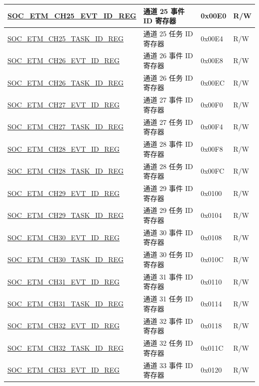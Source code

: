 \begin{longtable}{ | p{6cm} | p{6.2cm} | p{1.3cm} | p{2cm} | }
\hyperref[regdesc:SOCETMCHNEVTIDREG]{SOC\_ETM\_CH25\_EVT\_ID\_REG} & 通道 25 事件 ID 寄存器 & 0x00E0 & R/W \\ \hline
\hyperref[regdesc:SOCETMCHNTASKIDREG]{SOC\_ETM\_CH25\_TASK\_ID\_REG} & 通道 25 任务 ID 寄存器 & 0x00E4 & R/W \\ \hline
\hyperref[regdesc:SOCETMCHNEVTIDREG]{SOC\_ETM\_CH26\_EVT\_ID\_REG} & 通道 26 事件 ID 寄存器 & 0x00E8 & R/W \\ \hline
\hyperref[regdesc:SOCETMCHNTASKIDREG]{SOC\_ETM\_CH26\_TASK\_ID\_REG} & 通道 26 任务 ID 寄存器 & 0x00EC & R/W \\ \hline
\hyperref[regdesc:SOCETMCHNEVTIDREG]{SOC\_ETM\_CH27\_EVT\_ID\_REG} & 通道 27 事件 ID 寄存器 & 0x00F0 & R/W \\ \hline
\hyperref[regdesc:SOCETMCHNTASKIDREG]{SOC\_ETM\_CH27\_TASK\_ID\_REG} & 通道 27 任务 ID 寄存器 & 0x00F4 & R/W \\ \hline
\hyperref[regdesc:SOCETMCHNEVTIDREG]{SOC\_ETM\_CH28\_EVT\_ID\_REG} & 通道 28 事件 ID 寄存器 & 0x00F8 & R/W \\ \hline
\hyperref[regdesc:SOCETMCHNTASKIDREG]{SOC\_ETM\_CH28\_TASK\_ID\_REG} & 通道 28 任务 ID 寄存器 & 0x00FC & R/W \\ \hline
\hyperref[regdesc:SOCETMCHNEVTIDREG]{SOC\_ETM\_CH29\_EVT\_ID\_REG} & 通道 29 事件 ID 寄存器 & 0x0100 & R/W \\ \hline
\hyperref[regdesc:SOCETMCHNTASKIDREG]{SOC\_ETM\_CH29\_TASK\_ID\_REG} & 通道 29 任务 ID 寄存器 & 0x0104 & R/W \\ \hline
\hyperref[regdesc:SOCETMCHNEVTIDREG]{SOC\_ETM\_CH30\_EVT\_ID\_REG} & 通道 30 事件 ID 寄存器 & 0x0108 & R/W \\ \hline
\hyperref[regdesc:SOCETMCHNTASKIDREG]{SOC\_ETM\_CH30\_TASK\_ID\_REG} & 通道 30 任务 ID 寄存器 & 0x010C & R/W \\ \hline
\hyperref[regdesc:SOCETMCHNEVTIDREG]{SOC\_ETM\_CH31\_EVT\_ID\_REG} & 通道 31 事件 ID 寄存器 & 0x0110 & R/W \\ \hline
\hyperref[regdesc:SOCETMCHNTASKIDREG]{SOC\_ETM\_CH31\_TASK\_ID\_REG} & 通道 31 任务 ID 寄存器 & 0x0114 & R/W \\ \hline
\hyperref[regdesc:SOCETMCHNEVTIDREG]{SOC\_ETM\_CH32\_EVT\_ID\_REG} & 通道 32 事件 ID 寄存器 & 0x0118 & R/W \\ \hline
\hyperref[regdesc:SOCETMCHNTASKIDREG]{SOC\_ETM\_CH32\_TASK\_ID\_REG} & 通道 32 任务 ID 寄存器 & 0x011C & R/W \\ \hline
\hyperref[regdesc:SOCETMCHNEVTIDREG]{SOC\_ETM\_CH33\_EVT\_ID\_REG} & 通道 33 事件 ID 寄存器 & 0x0120 & R/W \\ \hline

\end{longtable}
